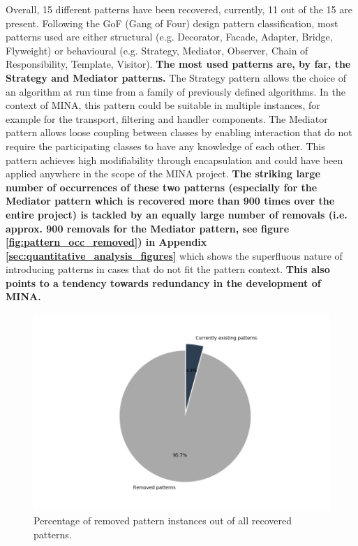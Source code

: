 Overall, 15 different patterns have been recovered, currently, 11 out of the 15 are present. Following the GoF (Gang of Four) \cite{gof} design pattern classification, most patterns used are either structural (e.g. Decorator, Facade, Adapter, Bridge, Flyweight) or behavioural (e.g. Strategy, Mediator, Observer, Chain of Responsibility, Template, Visitor). \textbf{The most used patterns are, by far, the Strategy and Mediator patterns.} The Strategy pattern allows the choice of an algorithm at run time from a family of previously defined algorithms. In the context of MINA, this pattern could be suitable in multiple instances, for example for the transport, filtering and handler components. The Mediator pattern allows loose coupling between classes by enabling interaction that do not require the participating classes to have any knowledge of each other. This pattern achieves high modifiability through encapsulation and could have been applied anywhere in the scope of the MINA project. \textbf{The striking large number of occurrences of these two patterns (especially for the Mediator pattern which is recovered more than 900 times over the entire project) is tackled by an equally large number of removals (i.e. approx. 900 removals for the Mediator pattern, see figure \ref{fig:pattern_occ_removed}) in Appendix \ref{sec:quantitative_analysis_figures}} which shows the superfluous nature of introducing patterns in cases that do not fit the pattern context. \textbf{This also points to a tendency towards redundancy in the development of MINA.}
\begin{figure}[H]
    \centering
    \includegraphics[width =  \textwidth]{images/graphs/current_removed_per.png}
    \caption{Percentage of removed pattern instances out of all recovered patterns.}
    \label{fig:per_removed_patterns}
\end{figure}
